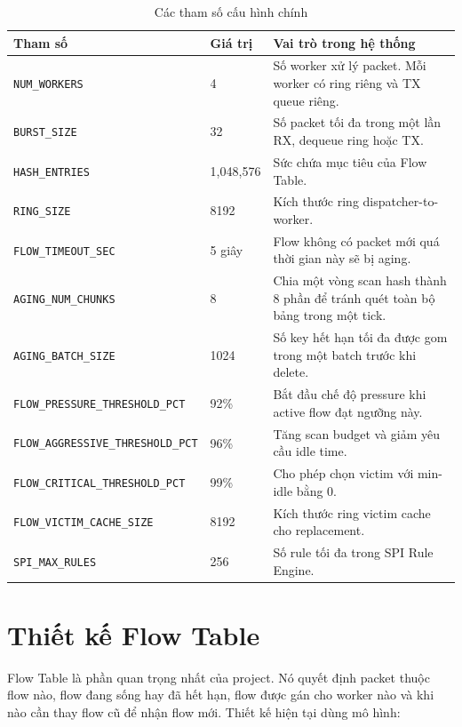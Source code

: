 \documentclass[12pt,a4paper]{report}
\DeclareRobustCommand{\code}[1]{{\small\texttt{#1}}}
\begin{document}
\begin{table}[H]
\centering
\footnotesize
\caption{Các tham số cấu hình chính}
\label{tab:config}
\begin{tabularx}{\textwidth}{|L{7cm}|C{2cm}|Y|}
\hline
\textbf{Tham số} & \textbf{Giá trị} & \textbf{Vai trò trong hệ thống} \\
\hline
\code{NUM\_WORKERS} & 4 & Số worker xử lý packet. Mỗi worker có ring riêng và TX queue riêng. \\
\hline
\code{BURST\_SIZE} & 32 & Số packet tối đa trong một lần RX, dequeue ring hoặc TX. \\
\hline
\code{HASH\_ENTRIES} & 1,048,576 & Sức chứa mục tiêu của Flow Table. \\
\hline
\code{RING\_SIZE} & 8192 & Kích thước ring dispatcher-to-worker. \\
\hline
\code{FLOW\_TIMEOUT\_SEC} & 5 giây & Flow không có packet mới quá thời gian này sẽ bị aging. \\
\hline
\code{AGING\_NUM\_CHUNKS} & 8 & Chia một vòng scan hash thành 8 phần để tránh quét toàn bộ bảng trong một tick. \\
\hline
\code{AGING\_BATCH\_SIZE} & 1024 & Số key hết hạn tối đa được gom trong một batch trước khi delete. \\
\hline
\code{FLOW\_PRESSURE\_THRESHOLD\_PCT} & 92\% & Bắt đầu chế độ pressure khi active flow đạt ngưỡng này. \\
\hline
\code{FLOW\_AGGRESSIVE\_THRESHOLD\_PCT} & 96\% & Tăng scan budget và giảm yêu cầu idle time. \\
\hline
\code{FLOW\_CRITICAL\_THRESHOLD\_PCT} & 99\% & Cho phép chọn victim với min-idle bằng 0. \\
\hline
\code{FLOW\_VICTIM\_CACHE\_SIZE} & 8192 & Kích thước ring victim cache cho replacement. \\
\hline
\code{SPI\_MAX\_RULES} & 256 & Số rule tối đa trong SPI Rule Engine. \\
\hline
\end{tabularx}
\end{table}

\section{Thiết kế Flow Table}

Flow Table là phần quan trọng nhất của project. Nó quyết định packet thuộc flow nào, flow đang sống hay đã hết hạn, flow được gán cho worker nào và khi nào cần thay flow cũ để nhận flow mới. Thiết kế hiện tại dùng mô hình:
\end{document}
